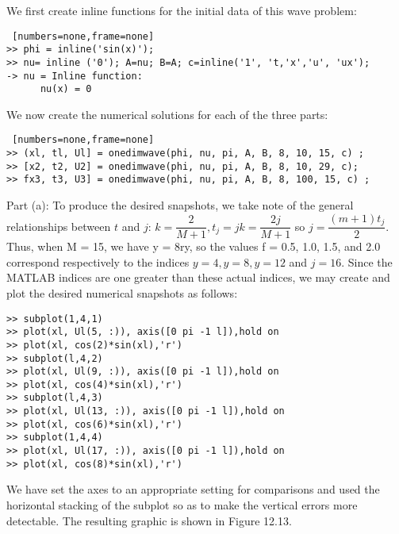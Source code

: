 \documentclass[../main.tex]{subfiles}
\begin{document}
{{We first create inline functions for the initial data of this wave problem:

 
\begin{lstlisting} [numbers=none,frame=none]
>> phi = inline('sin(x)'); 
>> nu= inline ('0'); A=nu; B=A; c=inline('1', 't,'x','u', 'ux'); 
-> nu = Inline function: 
	  nu(x) = 0
\end{lstlisting}
 
We now create the numerical solutions for each of the three parts: 
\begin{lstlisting} [numbers=none,frame=none]
>> (xl, tl, Ul] = onedimwave(phi, nu, pi, A, B, 8, 10, 15, c) ; 
>> [x2, t2, U2] = onedimwave(phi, nu, pi, A, B, 8, 10, 29, c); 
>> fx3, t3, U3] = onedimwave(phi, nu, pi, A, B, 8, 100, 15, c) ;
\end{lstlisting}
Part (a): To produce the desired snapshots, we take note of the general relationships between $t$ and $j$: $k=\dfrac{2}{M+1}, t_j=jk=\dfrac{2j}{M+1}$ so $j=\dfrac{(m+1)t_j}{2}$.
Thus, when M = 15, we have y = 8ry, so the values f = 0.5, 1.0, 1.5, and 2.0 correspond respectively to the indices $y = 4, y = 8, y = 12$ and $j = 16$. Since the MATLAB indices are one greater than these actual indices, we may create and plot the desired numerical snapshots as follows: 

\begin{lstlisting}[numbers=none,frame=none]
>> subplot(1,4,1) 
>> plot(xl, Ul(5, :)), axis([0 pi -1 l]),hold on 
>> plot(xl, cos(2)*sin(xl),'r') 
>> subplot(l,4,2) 
>> plot(xl, Ul(9, :)), axis([0 pi -1 l]),hold on 
>> plot(xl, cos(4)*sin(xl),'r') 
>> subplot(l,4,3) 
>> plot(xl, Ul(13, :)), axis([0 pi -1 l]),hold on 
>> plot(xl, cos(6)*sin(xl),'r') 
>> subplot(1,4,4) 
>> plot(xl, Ul(17, :)), axis([0 pi -1 l]),hold on 
>> plot(xl, cos(8)*sin(xl),'r') 
\end{lstlisting}
We have set the axes to an appropriate setting for comparisons and used the horizontal stacking of the subplot so as to make the vertical errors more detectable. 
The resulting graphic is shown in Figure 12.13.

}}
\end{document}
